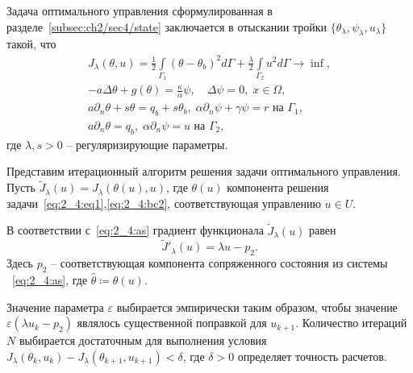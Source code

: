 Задача оптимального управления сформулированная в разделе~\ref{subsec:ch2/sec4/state}
заключается в отыскании тройки $\{\theta_\lambda,\psi_\lambda,u_\lambda\}$ такой, что
\begin{gather*}
    J_\lambda(\theta, u) =
    \frac{1}{2} \int \limits_{\Gamma_1} (\theta - \theta_b)^2 d \Gamma
    + \frac{\lambda}{2}\int\limits_{\Gamma_2} u^2 d\Gamma \rightarrow \inf, \\
    - a \Delta \theta + g (\theta) = \frac{\kappa}{\alpha}\psi, \quad
    \Delta \psi = 0, \; x \in \Omega, \\
    a \partial_n \theta + s \theta = q_b + s \theta_b,
    \; \alpha \partial_n \psi + \gamma \psi = r
    \text{ на } \Gamma_1,\\
    a \partial_n \theta = q_b, \;
    \alpha \partial_n \psi = u \text{ на } \Gamma_2,
\end{gather*}
где $\lambda, s > 0$ -- регуляризирующие параметры.


Представим итерационный алгоритм решения задачи оптимального управления.
Пусть $\tilde J_\lambda(u)=J_\lambda(\theta(u), u)$,
где $\theta(u)$ компонента решения
задачи~\eqref{eq:2_4:eq1},\eqref{eq:2_4:bc2},
соответствующая управлению $u\in U$.

В соответствии с~\eqref{eq:2_4:as} градиент функционала $\tilde J_\lambda(u)$ равен
\[ \tilde J'_\lambda (u) = \lambda u - p_2. \]
Здесь $p_2$ -- соответствующая компонента сопряженного состояния из системы ~\eqref{eq:2_4:as},
где $\hat{\theta}\coloneqq\theta(u)$.

Значение параметра $\varepsilon$ выбирается эмпирически таким образом, чтобы значение
$\varepsilon (\lambda u_k - p_2)$ являлось существенной поправкой для $u_{k+1}$.
Количество итераций $N$ выбирается достаточным для выполнения условия
$J_\lambda(\theta_k, u_k) - J_\lambda(\theta_{k+1}, u_{k+1}) < \delta$, где $\delta > 0$
определяет точность расчетов.

